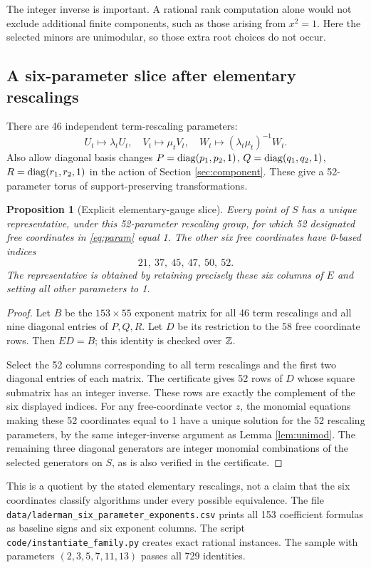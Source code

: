 \documentclass[11pt,letterpaper]{article}
\newtheorem{proposition}[theorem]{Proposition}
\theoremstyle{definition}\newtheorem{definition}[theorem]{Definition}
\theoremstyle{remark}\newtheorem{remark}[theorem]{Remark}
\newcommand{\file}[1]{\nolinkurl{#1}}
\begin{document}
The integer inverse is important. A rational rank computation alone would
not exclude additional finite components, such as those arising from
$x^2=1$. Here the selected minors are unimodular, so those extra root
choices do not occur.

\subsection{A six-parameter slice after elementary rescalings}
There are 46 independent term-rescaling parameters:
\[
 U_t\mapsto\lambda_tU_t,\quad V_t\mapsto\mu_tV_t,\quad
 W_t\mapsto(\lambda_t\mu_t)^{-1}W_t.
\]
Also allow diagonal basis changes
$P=\operatorname{diag}(p_1,p_2,1)$, $Q=\operatorname{diag}(q_1,q_2,1)$,
$R=\operatorname{diag}(r_1,r_2,1)$ in the action of Section \ref{sec:component}.
These give a 52-parameter torus of support-preserving transformations.

\begin{proposition}[Explicit elementary-gauge slice]\label{prop:slice}
Every point of $S$ has a unique representative, under this 52-parameter
rescaling group, for which 52 designated free coordinates in
\eqref{eq:param} equal 1. The other six free coordinates have 0-based
indices
\[
21,\ 37,\ 45,\ 47,\ 50,\ 52.
\]
The representative is obtained by retaining precisely these six columns
of $E$ and setting all other parameters to 1.
\end{proposition}
\begin{proof}
Let $B$ be the $153\times55$ exponent matrix for all 46 term rescalings
and all nine diagonal entries of $P,Q,R$. Let $D$ be its restriction to
the 58 free coordinate rows. Then $ED=B$; this identity is checked over
$\mathbb Z$.

Select the 52 columns corresponding to all term rescalings and the first
two diagonal entries of each matrix. The certificate gives 52 rows of
$D$ whose square submatrix has an integer inverse. These rows are exactly
the complement of the six displayed indices. For any free-coordinate
vector $z$, the monomial equations making these 52 coordinates equal to
1 have a unique solution for the 52 rescaling parameters, by the same
integer-inverse argument as Lemma \ref{lem:unimod}.
The remaining three diagonal generators are integer monomial
combinations of the selected generators on $S$, as is also verified in
the certificate.
\end{proof}

This is a quotient by the stated elementary rescalings, not a claim that
the six coordinates classify algorithms under every possible equivalence.
The file \file{data/laderman_six_parameter_exponents.csv} prints all 153
coefficient formulas as baseline signs and six exponent columns. The
script \file{code/instantiate_family.py} creates exact rational instances.
The sample with parameters $(2,3,5,7,11,13)$ passes all 729 identities.
\end{document}
